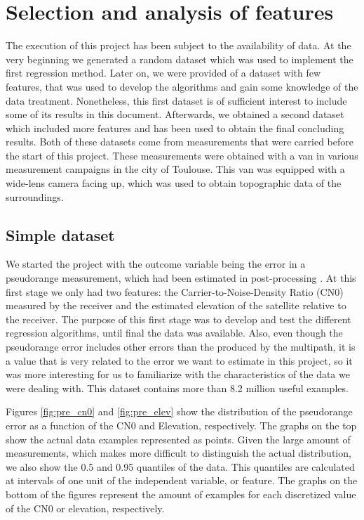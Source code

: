 \documentclass[a4paper, report, oneside, UKenglish]{memoir}
\begin{document}
\section{Selection and analysis of features}
The execution of this project has been subject to the availability of data. At the very beginning we generated a random dataset which was used to implement the first regression method. Later on, we were provided of a dataset with few features, that was used to develop the algorithms and gain some knowledge of the data treatment. Nonetheless, this first dataset is of sufficient interest to include some of its results in this document. Afterwards, we obtained a second dataset which included more features and has been used to obtain the final concluding results. Both of these datasets come from measurements that were carried before the start of this project. These measurements were obtained with a van in various measurement campaigns in the city of Toulouse. This van was equipped with a wide-lens camera facing up, which was used to obtain topographic data of the surroundings.

\subsection{Simple dataset}
We started the project with the outcome variable being the error in a pseudorange measurement, which had been estimated in post-processing \cite{matera_chatacterization_2019}. At this first stage we only had two features: the Carrier-to-Noise-Density Ratio (CN0) measured by the receiver and the estimated elevation of the satellite relative to the receiver. The purpose of this first stage was to develop and test the different regression algorithms, until final the data was available. Also, even though the pseudorange error includes other errors than the produced by the multipath, it is a value that is very related to the error we want to estimate in this project, so it was more interesting for us to familiarize with the characteristics of the data we were dealing with. This dataset contains more than 8.2 million useful examples.

Figures \ref{fig:pre_cn0} and \ref{fig:pre_elev} show the distribution of the pseudorange error as a function of the CN0 and Elevation, respectively. The graphs on the top show the actual data examples represented as points. Given the large amount of measurements, which makes more difficult to distinguish the actual distribution, we also show the 0.5 and 0.95 quantiles of the data. This quantiles are calculated at intervals of one unit of the independent variable, or feature. The graphs on the bottom of the figures represent the amount of examples for each discretized value of the CN0 or elevation, respectively.
\end{document}

